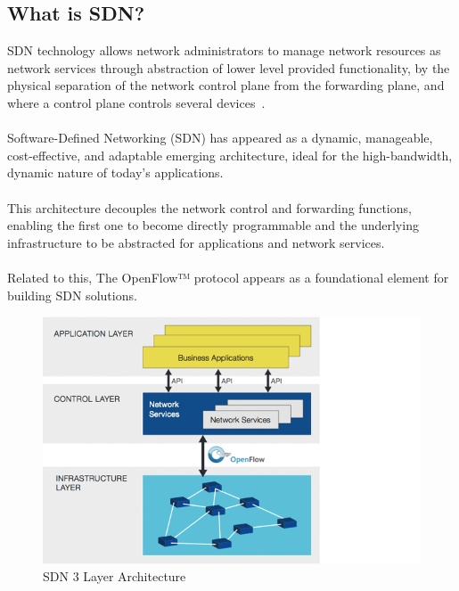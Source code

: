 \documentclass[a4paper, 12pt]{book}
\begin{document}
\subsection{What is SDN?}
SDN technology  allows network administrators to manage network resources as network services through abstraction of lower level provided functionality, by the physical separation of the network control plane from the forwarding plane, and where a control plane controls several devices~\cite{OpenNetworkingSDNDefinition}.\\
\\
Software-Defined Networking (SDN) has appeared as a dynamic, manageable, cost-effective, and adaptable emerging architecture, ideal for the high-bandwidth, dynamic nature of today's applications.\\
\\
This architecture decouples the network control and forwarding functions, enabling the first one to become directly programmable and the underlying infrastructure to be abstracted for applications and network services.\\
\\
Related to this, The OpenFlow™ protocol appears as a foundational element for building SDN solutions.

\begin{center}
 \begin{figure}[H]
 \begin{center}
   \includegraphics[width=20cm]{img/sdn-3layers.png}
   \caption{SDN 3 Layer Architecture}
   \label{fig:sdn3layer}
 \end{center}
 \end{figure}
\end{center}
\end{document}
